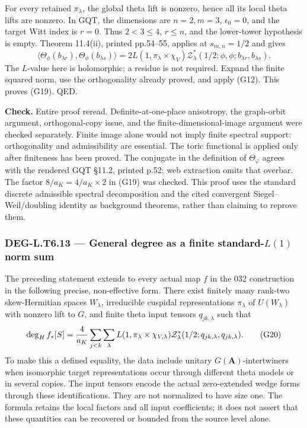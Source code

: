 \documentclass[11pt,a4paper]{article}
\theoremstyle{definition}
\begin{document}
For every retained \(\pi_\lambda\), the global theta lift is nonzero, hence all its local theta lifts are nonzero. In GQT, the dimensions are \(n=2,m=3\), \(\epsilon_0=0\), and the target Witt index is \(r=0\). Thus \(2<3\le4\), \(r\le n\), and the lower-tower hypothesis is empty. Theorem 11.4(ii), printed pp.54--55, applies at \(s_{m,n}=1/2\) and gives \[
\langle\Theta_\phi(b_{\lambda r}),\Theta_\phi(b_{\lambda s})\rangle
=2L(1,\pi_\lambda\times\chi_V)
\mathcal Z^*_{\lambda}(1/2;\phi,\phi;b_{\lambda r},b_{\lambda s}).
\] The \(L\)-value here is holomorphic; a residue is not required. Expand the finite squared norm, use the orthogonality already proved, and apply (G12). This proves (G19). QED.

\textbf{Check.} Entire proof reread. Definite-at-one-place anisotropy, the graph-orbit argument, orthogonal-copy issue, and the finite-dimensional-image argument were checked separately. Finite image alone would not imply finite spectral support: orthogonality and admissibility are essential. The toric functional is applied only after finiteness has been proved. The conjugate in the definition of \(\Theta_\varphi\) agrees with the rendered GQT §11.2, printed p.52; web extraction omits that overbar. The factor \(8/a_K=4/a_K\times2\) in (G19) was checked. This proof uses the standard discrete admissible spectral decomposition and the cited convergent Siegel--Weil/doubling identity as background theorems, rather than claiming to reprove them.

\subsubsection{\texorpdfstring{DEG-L.T6.13 --- General degree as a finite standard-\(L(1)\) norm sum}{DEG-L.T6.13 --- General degree as a finite standard-L(1) norm sum}}\label{DEG-L.T6.13}

The preceding statement extends to every actual map \(f\) in the 032 construction in the following precise, non-effective form. There exist finitely many rank-two skew-Hermitian spaces \(W_\lambda\), irreducible cuspidal representations \(\pi_\lambda\) of \(U(W_\lambda)\) with nonzero lift to \(G\), and finite theta input tensors \(q_{jk,\lambda}\) such that \[
\deg_H f_*[S]
={4\over a_K}\sum_{j<k}\sum_\lambda
 L(1,\pi_\lambda\times\chi_{V,\lambda})
 \mathcal Z^*_{\lambda}(1/2;q_{jk,\lambda},q_{jk,\lambda}).
\tag{G20}
\] To make this a defined equality, the data include unitary \(G(\mathbf A)\)-intertwiners when isomorphic target representations occur through different theta models or in several copies. The input tensors encode the actual zero-extended wedge forms through these identifications. They are not normalized to have size one. The formula retains the local factors and all input coefficients; it does not assert that these quantities can be recovered or bounded from the source level alone.
\end{document}
